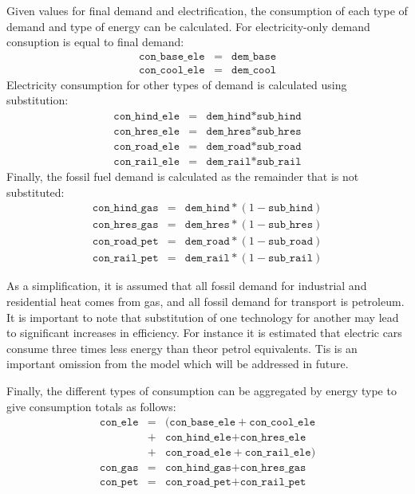 \documentclass[notitlepage,a4paper]{article}
\begin{document}
Given values for final demand and electrification, the consumption of each type of demand and type of energy can be calculated.  For electricity-only demand consuption is equal to final demand:
\begin{eqnarray}
\texttt{con\_base\_ele} &=& \texttt{dem\_base} \\
\texttt{con\_cool\_ele} &=& \texttt{dem\_cool}
\end{eqnarray}
Electricity consumption for other types of demand is calculated using substitution:
\begin{eqnarray}
\texttt{con\_hind\_ele} &=& \texttt{dem\_hind} *  \texttt{sub\_hind}\\
\texttt{con\_hres\_ele} &=& \texttt{dem\_hres} *  \texttt{sub\_hres}\\
\texttt{con\_road\_ele} &=& \texttt{dem\_road} *  \texttt{sub\_road}\\
\texttt{con\_rail\_ele} &=& \texttt{dem\_rail} *  \texttt{sub\_rail}
\end{eqnarray}
Finally, the fossil fuel demand is calculated as the remainder that is not substituted:
\begin{eqnarray}
\texttt{con\_hind\_gas} &=& \texttt{dem\_hind} *  (1 - \texttt{sub\_hind})\\
\texttt{con\_hres\_gas} &=& \texttt{dem\_hres} *  (1 - \texttt{sub\_hres})\\
\texttt{con\_road\_pet} &=& \texttt{dem\_road} *  (1 - \texttt{sub\_road})\\
\texttt{con\_rail\_pet} &=& \texttt{dem\_rail} *  (1 - \texttt{sub\_rail})
\end{eqnarray}

As a simplification, it is assumed that all fossil demand for industrial and residential heat comes from gas, and all fossil demand for transport is petroleum.  It is important to note that substitution of one technology for another may lead to significant increases in efficiency.  For instance it is estimated that electric cars consume three times less energy than theor petrol equivalents.  Tis is an important omission from the model which will be addressed in future.  

Finally, the different types of consumption can be aggregated by energy type to give consumption totals as follows:
\begin{eqnarray}
\texttt{con\_ele} &=& (\texttt{con\_base\_ele} + \texttt{con\_cool\_ele} \\
&+& \texttt{con\_hind\_ele} + \texttt{con\_hres\_ele} \\
&+& \texttt{con\_road\_ele} + \texttt{con\_rail\_ele} )\\
\texttt{con\_gas} &=& \texttt{con\_hind\_gas} + \texttt{con\_hres\_gas}\\
\texttt{con\_pet} &=& \texttt{con\_road\_pet} + \texttt{con\_rail\_pet}
\end{eqnarray}
\end{document}
